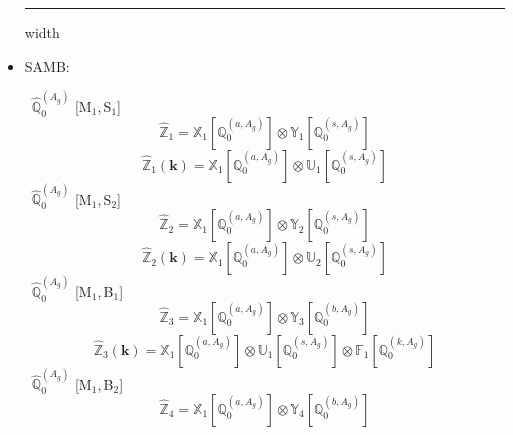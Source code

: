 \documentclass[fleqn,10pt,landscape]{article}
\begin{document}
\begin{itemize}
 \hfil \hrule height 1mm width \textwidth \hfil

\item SAMB:

\vspace{4mm}
\noindent {} $\,\,\,\hat{\mathbb{Q}}_{0}^{(A_{g})}$ [M$_{1}$,\,S$_{1}$]
\begin{dmath*}
\hat{\mathbb{Z}}_{1}=\mathbb{X}_{1}[\mathbb{Q}_{0}^{(a,A_{g})}] \otimes\mathbb{Y}_{1}[\mathbb{Q}_{0}^{(s,A_{g})}]
\end{dmath*}
\begin{dmath*}
\hat{\mathbb{Z}}_{1}(\bm{k})=\mathbb{X}_{1}[\mathbb{Q}_{0}^{(a,A_{g})}] \otimes\mathbb{U}_{1}[\mathbb{Q}_{0}^{(s,A_{g})}]
\end{dmath*}
\vspace{4mm}
\noindent {} $\,\,\,\hat{\mathbb{Q}}_{0}^{(A_{g})}$ [M$_{1}$,\,S$_{2}$]
\begin{dmath*}
\hat{\mathbb{Z}}_{2}=\mathbb{X}_{1}[\mathbb{Q}_{0}^{(a,A_{g})}] \otimes\mathbb{Y}_{2}[\mathbb{Q}_{0}^{(s,A_{g})}]
\end{dmath*}
\begin{dmath*}
\hat{\mathbb{Z}}_{2}(\bm{k})=\mathbb{X}_{1}[\mathbb{Q}_{0}^{(a,A_{g})}] \otimes\mathbb{U}_{2}[\mathbb{Q}_{0}^{(s,A_{g})}]
\end{dmath*}
\vspace{4mm}
\noindent {} $\,\,\,\hat{\mathbb{Q}}_{0}^{(A_{g})}$ [M$_{1}$,\,B$_{1}$]
\begin{dmath*}
\hat{\mathbb{Z}}_{3}=\mathbb{X}_{1}[\mathbb{Q}_{0}^{(a,A_{g})}] \otimes\mathbb{Y}_{3}[\mathbb{Q}_{0}^{(b,A_{g})}]
\end{dmath*}
\begin{dmath*}
\hat{\mathbb{Z}}_{3}(\bm{k})=\mathbb{X}_{1}[\mathbb{Q}_{0}^{(a,A_{g})}] \otimes\mathbb{U}_{1}[\mathbb{Q}_{0}^{(s,A_{g})}] \otimes\mathbb{F}_{1}[\mathbb{Q}_{0}^{(k,A_{g})}]
\end{dmath*}
\vspace{4mm}
\noindent {} $\,\,\,\hat{\mathbb{Q}}_{0}^{(A_{g})}$ [M$_{1}$,\,B$_{2}$]
\begin{dmath*}
\hat{\mathbb{Z}}_{4}=\mathbb{X}_{1}[\mathbb{Q}_{0}^{(a,A_{g})}] \otimes\mathbb{Y}_{4}[\mathbb{Q}_{0}^{(b,A_{g})}]
\end{dmath*}

\end{itemize}
\end{document}
